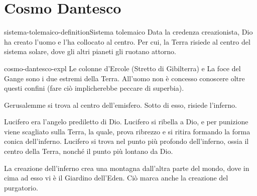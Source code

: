 \documentclass[preview]{standalone}
\begin{document}
\genpage

\section{Cosmo Dantesco}

\begin{snippetdefinition}{sistema-tolemaico-definition}{Sistema tolemaico}
    Data la credenza creazionista, Dio ha creato l'uomo e l'ha collocato al centro.
    Per cui, la Terra risiede al centro del sistema solare, dove gli altri pianeti gli ruotano attorno.
\end{snippetdefinition}

\begin{snippet}{cosmo-dantesco-expl}
    Le colonne d'Ercole (Stretto di Gibilterra) e La foce del Gange
    sono i due estremi della Terra. All'uomo non è concesso conoscere oltre questi confini
    (fare ciò implicherebbe peccare di superbia).
    
    Gerusalemme si trova al centro dell'emisfero. Sotto di esso, risiede l'inferno.
    
    Lucifero era l'angelo prediletto di Dio.
    Lucifero si ribella a Dio, e per punizione viene scagliato sulla Terra, la quale,
    prova ribrezzo e si ritira formando la forma conica dell'inferno. Lucifero si trova nel punto
    più profondo dell'inferno, ossia il centro della Terra, nonché il punto più lontano da Dio.
    
    La creazione dell'inferno crea una montagna dall'altra parte del mondo, dove in cima ad esso
    vi è il Giardino dell'Eden. Ciò marca anche la creazione del purgatorio.
\end{snippet}

\end{document}
